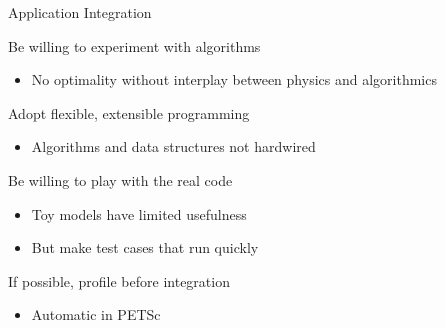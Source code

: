 \begin{frame}{Application Integration}

\begin{block}{Be willing to experiment with algorithms}
  \begin{itemize}
    \item No optimality without interplay between physics and algorithmics
  \end{itemize}
\end{block}

\begin{block}{Adopt flexible, extensible programming}
  \begin{itemize}
    \item Algorithms and data structures not hardwired
  \end{itemize}
\end{block}

\begin{block}{Be willing to play with the real code}
  \begin{itemize}
    \item Toy models have limited usefulness
    \item But make test cases that run quickly
  \end{itemize}
\end{block}

\begin{block}{If possible, profile before integration}
  \begin{itemize}
    \item Automatic in PETSc
  \end{itemize}
\end{block}

\end{frame}
